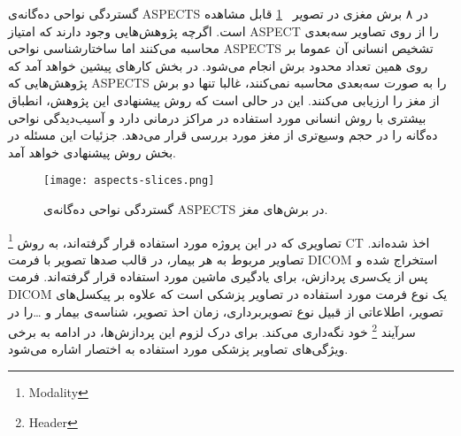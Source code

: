 گستردگی نواحی ده‌گانه‌ی ASPECTS در ۸ برش مغزی در تصویر ~\ref{fig:aspects-slices} قابل مشاهده است.
اگرچه پژوهش‌هایی وجود دارند که امتیاز ASPECT را از روی تصاویر سه‌بعدی محاسبه می‌کنند اما 
ساختارشناسی نواحی ASPECTS تشخیص انسانی آن عموما بر روی همین تعداد محدود برش انجام می‌شود.
در بخش کارهای پیشین خواهد آمد که پژوهش‌هایی که ASPECTS را به صورت سه‌بعدی محاسبه نمی‌کنند، غالبا تنها دو برش از مغز را ارزیابی می‌کنند.
این در حالی است که روش پیشنهادی این پژوهش، انطباق بیشتری با روش انسانی مورد استفاده در مراکز درمانی دارد و 
آسیب‌دیدگی نواحی ده‌گانه را در حجم وسیع‌تری از مغز مورد بررسی قرار می‌دهد. جزئیات این مسئله در بخش روش پیشنهادی خواهد آمد.

\begin{figure}[ht]
\centering
\texttt{[image: aspects-slices.png]}
\caption[]{گستردگی نواحی ده‌گانه‌ی ASPECTS در برش‌های مغز.}
\label{fig:aspects-slices}
\end{figure}


تصاویری که در این پروژه مورد استفاده قرار گرفته‌اند، به روش
\footnote{Modality}
 CT اخذ شده‌اند.
تصاویر مربوط به هر بیمار، در قالب صدها تصویر با فرمت DICOM استخراج شده و پس از یک‌سری پردازش، برای یادگیری ماشین مورد استفاده قرار گرفته‌اند.
فرمت DICOM یک نوع فرمت مورد استفاده در تصاویر پزشکی است که علاوه بر پیکسل‌های تصویر، اطلاعاتی از قبیل نوع تصویربرداری، زمان احذ تصویر، شناسه‌ی بیمار و \dots را در سرآیند
\footnote{Header}
خود نگه‌داری می‌کند.
برای درک لزوم این پردازش‌ها، در ادامه به برخی ویژگی‌های تصاویر پزشکی مورد استفاده به اختصار اشاره می‌شود.

